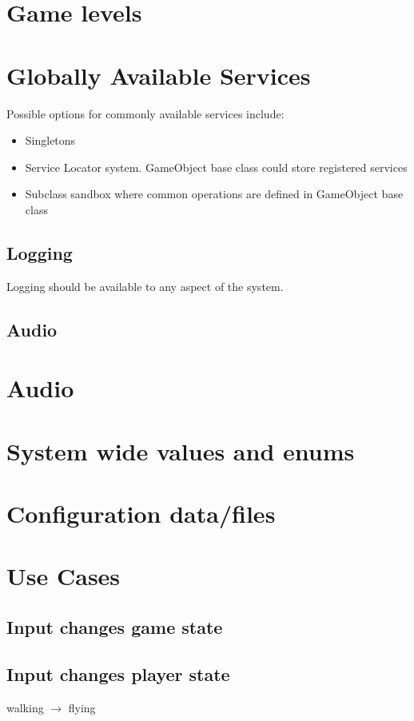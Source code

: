 \documentclass[12pt]{article}
\begin{document}
\section{	Game levels}

\section{ Globally Available Services}
Possible options for commonly available services include:
\begin{itemize}
	\item Singletons
	\item Service Locator system.  GameObject base class could store registered services
	\item Subclass sandbox where common operations are defined in GameObject base class
\end{itemize}

\subsection{ Logging }
Logging should be available to any aspect of the system. 
\subsection{ Audio } 

\section{ Audio }

\section{	System wide values and enums}

\section{	Configuration data/files}

\section{Use Cases}
\subsection{Input changes game state}
\subsection{Input changes player state}
walking $\rightarrow$ flying
\end{document}
